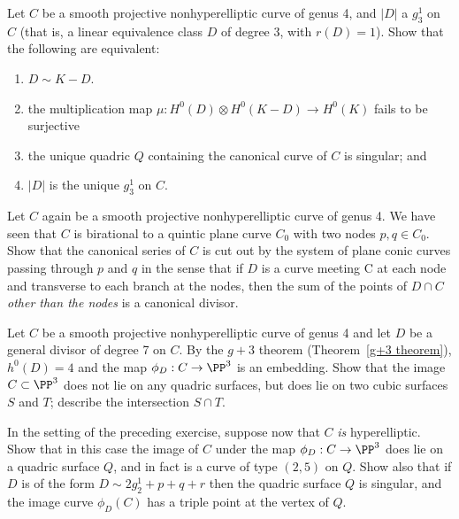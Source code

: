 \begin{exercise} \label{ex7.1}
Let $C$ be a smooth projective nonhyperelliptic curve of genus 4, and $|D|$ a $g^1_3$ on $C$ (that is, a linear equivalence class $D$ of degree 3, with $r(D) = 1$). Show that the following are equivalent:
\begin{enumerate}
\item $D \sim K-D$. 
\item the multiplication map $\mu : H^0(D) \otimes H^0(K-D) \to H^0(K)$ fails to be surjective
\item the unique quadric $Q$ containing the canonical curve of $C$ is singular; and
\item $|D|$ is the unique $g^1_3$ on $C$.
\end{enumerate}
\end{exercise}

\begin{exercise}\label{ex7.2}
Let $C$ again be a smooth projective nonhyperelliptic curve of genus 4. We have seen that $C$ is birational to a quintic plane curve $C_0$ with two nodes $p, q \in C_0$. Show that the canonical series of $C$ is cut out by the system of plane conic curves passing through $p$ and $q$ in the sense
that if $D$ is a curve meeting C at each node and transverse to each branch at the nodes, then
the sum of the points of $D\cap C$ \emph{other than the nodes} is a canonical divisor.
\end{exercise}

\begin{exercise}\label{ex7.3}
Let $C$  be a smooth projective nonhyperelliptic curve of genus 4 and let $D$ be a general divisor of degree 7 on $C$. By the $g+3$ theorem (Theorem~\ref{g+3 theorem}), $h^0(D) = 4$ and the map $\phi_D : C \to \PP^3$ is an embedding. Show that the image $C \subset \PP^3$ does not lie on any quadric surfaces, but does lie on two cubic surfaces $S$ and $T$; describe the intersection $S \cap T$.
\end{exercise}

\begin{exercise}\label{ex7.4}
In the setting of the preceding exercise, suppose now that $C$ \emph{is} hyperelliptic. Show that in this case the image of $C$ under the map $\phi_D : C \to \PP^3$ does lie on a quadric surface $Q$, and in fact is a curve of type $(2,5)$ on $Q$. Show also that if $D$ is of the form $D \sim 2g^1_2 + p + q + r$ then the quadric surface $Q$ is singular, and the image curve $\phi_D(C)$ has a triple point at the vertex of $Q$.
 \end{exercise}

